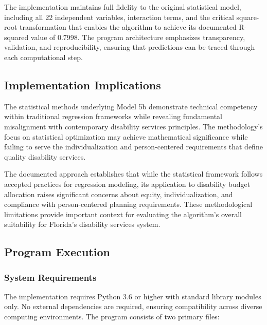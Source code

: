 The implementation maintains full fidelity to the original statistical model, including all 22 independent variables, interaction terms, and the critical square-root transformation that enables the algorithm to achieve its documented R-squared value of 0.7998. The program architecture emphasizes transparency, validation, and reproducibility, ensuring that predictions can be traced through each computational step.

\subsection{Implementation Implications}

The statistical methods underlying Model 5b demonstrate technical competency within traditional regression frameworks while revealing fundamental misalignment with contemporary disability services principles. The methodology's focus on statistical optimization may achieve mathematical significance while failing to serve the individualization and person-centered requirements that define quality disability services.

The documented approach establishes that while the statistical framework follows accepted practices for regression modeling, its application to disability budget allocation raises significant concerns about equity, individualization, and compliance with person-centered planning requirements. These methodological limitations provide important context for evaluating the algorithm's overall suitability for Florida's disability services system.


\subsection{Program Execution}

\subsubsection{System Requirements}

The implementation requires Python 3.6 or higher with standard library modules only. No external dependencies are required, ensuring compatibility across diverse computing environments. The program consists of two primary files:

